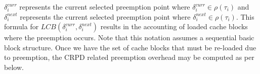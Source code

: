 \noindent
\begin{math}\delta_{i}^{curr}\end{math} represents the current selected preemption point where \begin{math}\delta_{i}^{curr} \in \rho(\tau_{i})\end{math} and \begin{math}\delta_{i}^{next}\end{math} represents the current selected preemption point where \begin{math}\delta_{i}^{next} \in \rho(\tau_{i})\end{math}.  This formula for \begin{math}\textit{LCB}(\delta_{i}^{curr},\delta_{i}^{next})\end{math} results in the accounting of loaded cache blocks where the preemption occurs.  Note that this notation assumes a sequential basic block structure. Once we have the set of cache blocks that must be re-loaded due to preemption, the CRPD related preemption overhead may be computed as per below.
